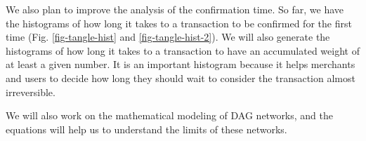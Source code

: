 We also plan to improve the analysis of the confirmation time. So far, we have the histograms of how long it takes to a transaction to be confirmed for the first time (Fig. \ref{fig-tangle-hist} and \ref{fig-tangle-hist-2}). We will also generate the histograms of how long it takes to a transaction to have an accumulated weight of at least a given number. It is an important histogram because it helps merchants and users to decide how long they should wait to consider the transaction almost irreversible.

We will also work on the mathematical modeling of DAG networks, and the equations will help us to understand the limits of these networks.
